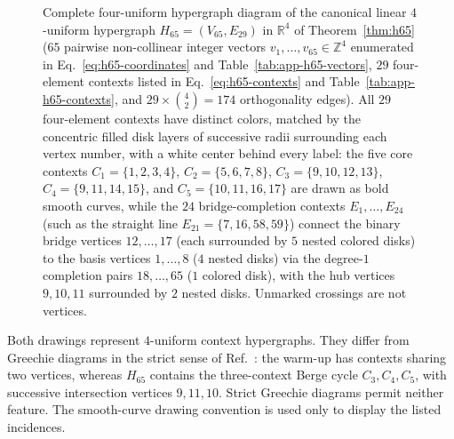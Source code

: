 \documentclass[
  aps,
  pra,
  reprint,
  superscriptaddress,
  amsmath,
  amssymb,
  nofootinbib,
  floatfix
]{revtex4-2}
\theoremstyle{definition}
\theoremstyle{remark}
\newcommand{\R}{\mathbb{R}}
\begin{document}
\begin{figure}[tbp]
{%
}
\caption{Complete four-uniform hypergraph diagram of the canonical linear $4$-uniform hypergraph $H_{65}=(V_{65},E_{29})$ in $\R^4$ of Theorem~\ref{thm:h65} ($65$ pairwise non-collinear integer vectors $v_1,\ldots,v_{65}\in\mathbb{Z}^4$ enumerated in Eq.~\eqref{eq:h65-coordinates} and Table~\ref{tab:app-h65-vectors}, $29$ four-element contexts listed in Eq.~\eqref{eq:h65-contexts} and Table~\ref{tab:app-h65-contexts}, and $29\times\binom{4}{2}=174$ orthogonality edges). All $29$ four-element contexts have distinct colors, matched by the concentric filled disk layers of successive radii surrounding each vertex number, with a white center behind every label: the five core contexts $C_1=\{1,2,3,4\}$, $C_2=\{5,6,7,8\}$, $C_3=\{9,10,12,13\}$, $C_4=\{9,11,14,15\}$, and $C_5=\{10,11,16,17\}$ are drawn as bold smooth curves, while the $24$ bridge-completion contexts $E_1,\ldots,E_{24}$ (such as the straight line $E_{21}=\{7,16,58,59\}$) connect the binary bridge vertices $12,\ldots,17$ (each surrounded by $5$ nested colored disks) to the basis vertices $1,\ldots,8$ ($4$ nested disks) via the degree-$1$ completion pairs $18,\ldots,65$ ($1$ colored disk), with the hub vertices $9,10,11$ surrounded by $2$ nested disks. Unmarked crossings are not vertices.}\label{fig:h65-hypergraph}
\end{figure}
Both drawings represent $4$-uniform context hypergraphs. They differ from Greechie diagrams in the strict sense of Ref.~\cite[Definition~2.4]{svozil-tkadlec}: the warm-up has contexts sharing two vertices, whereas $H_{65}$ contains the three-context Berge cycle $C_3,C_4,C_5$, with successive intersection vertices $9,11,10$. Strict Greechie diagrams permit neither feature. The smooth-curve drawing convention is used only to display the listed incidences.
\end{document}
